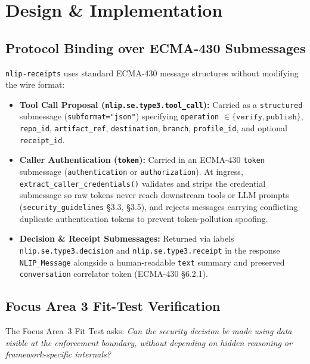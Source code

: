 \documentclass[sigconf,nonacm]{acmart}
\begin{document}
\section{Design \& Implementation}

\subsection{Protocol Binding over ECMA-430 Submessages}
\texttt{nlip-receipts} uses standard ECMA-430 message structures without modifying the wire format:
\begin{itemize}
  \item \textbf{Tool Call Proposal (\texttt{nlip.se.type3.tool\_call}):} Carried as a \texttt{structured} submessage (\texttt{subformat="json"}) specifying \texttt{operation} $\in \{\texttt{verify}, \texttt{publish}\}$, \texttt{repo\_id}, \texttt{artifact\_ref}, \texttt{destination}, \texttt{branch}, \texttt{profile\_id}, and optional \texttt{receipt\_id}.
  \item \textbf{Caller Authentication (\texttt{token}):} Carried in an ECMA-430 \texttt{token} submessage (\texttt{authentication} or \texttt{authorization}). At ingress, \texttt{extract\_caller\_credentials()} validates and strips the credential submessage so raw tokens never reach downstream tools or LLM prompts (\texttt{security\_guidelines} \S3.3, \S3.5), and rejects messages carrying conflicting duplicate authentication tokens to prevent token-pollution spoofing.
  \item \textbf{Decision \& Receipt Submessages:} Returned via labels \texttt{nlip.se.type3.decision} and \texttt{nlip.se.type3.receipt} in the response \texttt{NLIP\_Message} alongside a human-readable \texttt{text} summary and preserved \texttt{conversation} correlator token (ECMA-430 \S6.2.1).
\end{itemize}

\subsection{Focus Area 3 Fit-Test Verification}
The Focus Area~3 Fit Test asks: \emph{Can the security decision be made using data visible at the enforcement boundary, without depending on hidden reasoning or framework-specific internals?}
\end{document}
